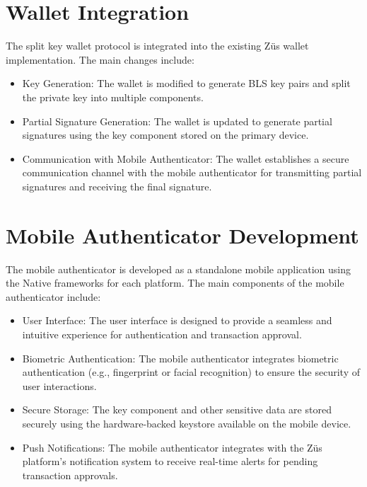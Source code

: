 \section{Wallet Integration}
The split key wallet protocol is integrated into the existing Züs wallet implementation. The main changes include:
\begin{itemize}
    \item Key Generation: The wallet is modified to generate BLS key pairs and split the private key into multiple components.
    \item Partial Signature Generation: The wallet is updated to generate partial signatures using the key component stored on the primary device.
    \item Communication with Mobile Authenticator: The wallet establishes a secure communication channel with the mobile authenticator for transmitting partial signatures and receiving the final signature.
\end{itemize}
\section{Mobile Authenticator Development}
The mobile authenticator is developed as a standalone mobile application using the Native frameworks for each platform. The main components of the mobile authenticator include:
\begin{itemize}
    \item User Interface: The user interface is designed to provide a seamless and intuitive experience for authentication and transaction approval.
    \item Biometric Authentication: The mobile authenticator integrates biometric authentication (e.g., fingerprint or facial recognition) to ensure the security of user interactions.
    \item Secure Storage: The key component and other sensitive data are stored securely using the hardware-backed keystore available on the mobile device.
    \item Push Notifications: The mobile authenticator integrates with the Züs platform's notification system to receive real-time alerts for pending transaction approvals.
\end{itemize}
